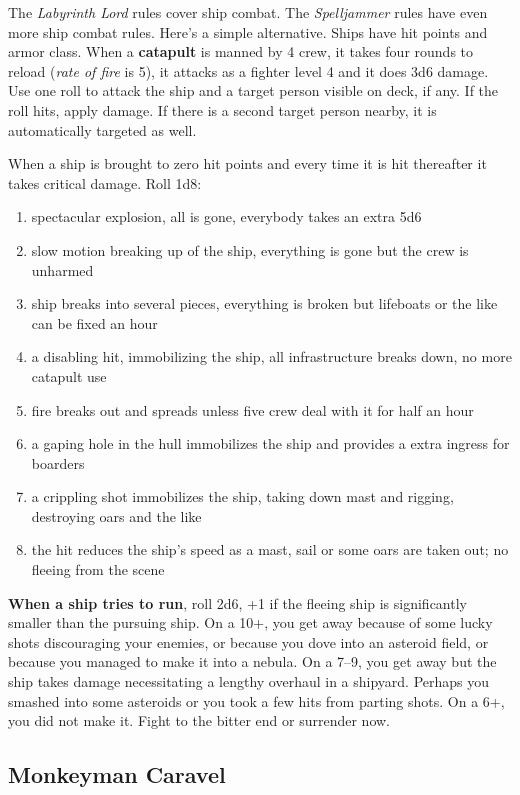 \documentclass[11pt]{bxart}
\begin{document}
The \textit{Labyrinth Lord} rules cover ship combat. The \textit{Spelljammer} rules have even more ship combat rules. Here's a simple alternative. Ships have hit points and armor class. When a \textbf{catapult} is manned by 4 crew, it takes four rounds to reload (\textit{rate of fire} is 5), it attacks as a fighter level 4 and it does 3d6 damage. Use one roll to attack the ship and a target person visible on deck, if any. If the roll hits, apply damage. If there is a second target person nearby, it is automatically targeted as well.

When a ship is brought to zero hit points and every time it is hit thereafter it takes critical damage. Roll 1d8:

\begin{enumerate}
\item spectacular explosion, all is gone, everybody takes an extra 5d6
\item slow motion breaking up of the ship, everything is gone but the crew is unharmed
\item ship breaks into several pieces, everything is broken but lifeboats or the like can be fixed an hour
\item a disabling hit, immobilizing the ship, all infrastructure breaks down, no more catapult use
\item fire breaks out and spreads unless five crew deal with it for half an hour
\item a gaping hole in the hull immobilizes the ship and provides a extra ingress for boarders
\item a crippling shot immobilizes the ship, taking down mast and rigging, destroying oars and the like
\item the hit reduces the ship's speed as a mast, sail or some oars are taken out; no fleeing from the scene
\end{enumerate}

\textbf{When a ship tries to run}, roll 2d6, +1 if the fleeing ship is significantly smaller than the pursuing ship. On a 10+, you get away because of some lucky shots discouraging your enemies, or because you dove into an asteroid field, or because you managed to make it into a nebula. On a 7--9, you get away but the ship takes damage necessitating a lengthy overhaul in a shipyard. Perhaps you smashed into some asteroids or you took a few hits from parting shots. On a 6+, you did not make it. Fight to the bitter end or surrender now.

\subsection{Monkeyman Caravel}
\end{document}
